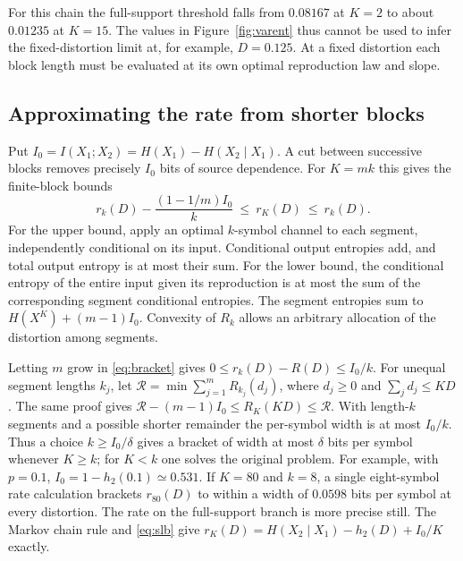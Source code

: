 \documentclass[11pt,letterpaper]{article}
\theoremstyle{definition}
\newcommand{\hx}{h_2}
\begin{document}
For this chain the full-support threshold falls from $0.08167$ at $K=2$ to about $0.01235$ at $K=15$. The values in Figure~\ref{fig:varent} thus cannot be used to infer the fixed-distortion limit at, for example, $D=0.125$. At a fixed distortion each block length must be evaluated at its own optimal reproduction law and slope.

\subsection{Approximating the rate from shorter blocks}
Put $I_0=I(X_1;X_2)=H(X_1)-H(X_2\mid X_1)$. A cut between successive blocks removes precisely $I_0$ bits of source dependence. For $K=mk$ this gives the finite-block bounds \cite{wynerziv,blahut,jalali}
\begin{equation}
 r_k(D)-\frac{(1-1/m)I_0}{k}\ \le\ r_K(D)\ \le\ r_k(D).        \label{eq:bracket}
\end{equation}
For the upper bound, apply an optimal $k$-symbol channel to each segment, independently conditional on its input. Conditional output entropies add, and total output entropy is at most their sum. For the lower bound, the conditional entropy of the entire input given its reproduction is at most the sum of the corresponding segment conditional entropies. The segment entropies sum to $H(X^K)+(m-1)I_0$. Convexity of $R_k$ allows an arbitrary allocation of the distortion among segments.

Letting $m$ grow in \eqref{eq:bracket} gives $0\le r_k(D)-R(D)\le I_0/k$. For unequal segment lengths $k_j$, let $\mathcal R=\min\sum_{j=1}^mR_{k_j}(d_j)$, where $d_j\ge0$ and $\sum_jd_j\le KD$. The same proof gives $\mathcal R-(m-1)I_0\le R_K(KD)\le \mathcal R$. With length-$k$ segments and a possible shorter remainder the per-symbol width is at most $I_0/k$. Thus a choice $k\ge I_0/\delta$ gives a bracket of width at most $\delta$ bits per symbol whenever $K\ge k$; for $K<k$ one solves the original problem. For example, with $p=0.1$, $I_0=1-\hx(0.1)\simeq0.531$. If $K=80$ and $k=8$, a single eight-symbol rate calculation brackets $r_{80}(D)$ to within a width of $0.0598$ bits per symbol at every distortion. The rate on the full-support branch is more precise still. The Markov chain rule and \eqref{eq:slb} give $r_K(D)=H(X_2\mid X_1)-\hx(D)+I_0/K$ exactly.
\end{document}
